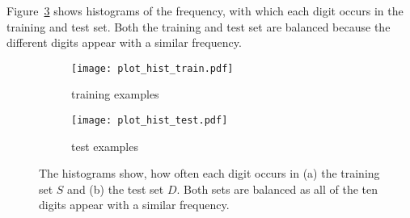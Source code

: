 Figure~\ref{fig:plot_hist} shows histograms of the frequency, with which each digit occurs in the training and test set. Both the training and test set are balanced because the different digits appear with a similar frequency.

\begin{figure}[h!]
    \begin{subfigure}[t]{0.5\textwidth}
        \centering
        \texttt{[image: plot\_hist\_train.pdf]} 
        \caption{training examples} \label{fig:plot_hist_train}
    \end{subfigure}
    \hfill
    \begin{subfigure}[t]{0.5\textwidth}
        \centering
        \texttt{[image: plot\_hist\_test.pdf]} 
        \caption{test examples} \label{fig:plot_hist_test}
    \end{subfigure}
    \caption{The histograms show, how often each digit occurs in (a) the training set $S$ and (b) the test set $D$. Both sets are balanced as all of the ten digits appear with a similar frequency.}
\label{fig:plot_hist}
\end{figure}


